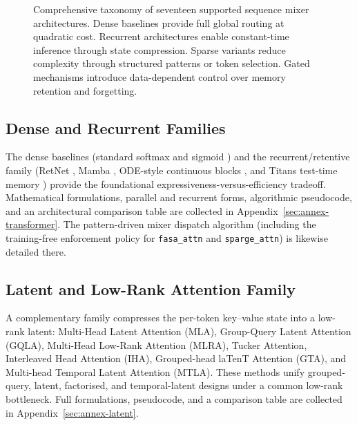 \begin{figure}[t]
{}
\caption{Comprehensive taxonomy of seventeen supported sequence mixer architectures. Dense baselines provide full global routing at quadratic cost. Recurrent architectures enable constant-time inference through state compression. Sparse variants reduce complexity through structured patterns or token selection. Gated mechanisms introduce data-dependent control over memory retention and forgetting.}
\label{fig:comprehensive-taxonomy}
\end{figure}

\subsection{Dense and Recurrent Families}
The dense baselines (standard softmax \citep{vaswani_attention_2017} and sigmoid \citep{ramapuram_theory_2024}) and the recurrent/retentive family (RetNet \citep{sun_retentive_2023}, Mamba \citep{gu_mamba_2023}, ODE-style continuous blocks \citep{zhang_continuous_2021}, and Titans test-time memory \citep{behrouz_titans_2025}) provide the foundational expressiveness-versus-efficiency tradeoff. Mathematical formulations, parallel and recurrent forms, algorithmic pseudocode, and an architectural comparison table are collected in Appendix~\ref{sec:annex-transformer}. The pattern-driven mixer dispatch algorithm (including the training-free enforcement policy for \texttt{fasa\_attn} and \texttt{sparge\_attn}) is likewise detailed there.

\subsection{Latent and Low-Rank Attention Family}
A complementary family compresses the per-token key--value state into a low-rank latent: Multi-Head Latent Attention (MLA), Group-Query Latent Attention (GQLA), Multi-Head Low-Rank Attention (MLRA), Tucker Attention, Interleaved Head Attention (IHA), Grouped-head laTenT Attention (GTA), and Multi-head Temporal Latent Attention (MTLA). These methods unify grouped-query, latent, factorised, and temporal-latent designs under a common low-rank bottleneck. Full formulations, pseudocode, and a comparison table are collected in Appendix~\ref{sec:annex-latent}.

